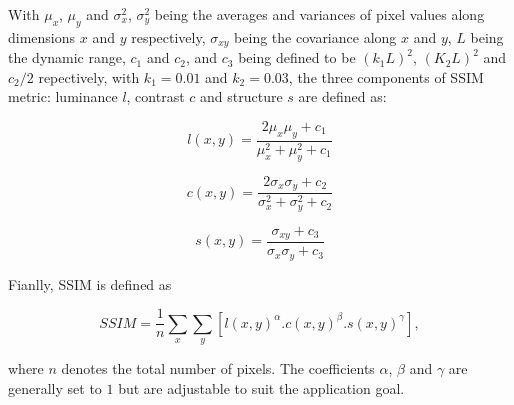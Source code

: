 \documentclass{article}
\begin{document}
With $\mu_x$, $\mu_y$ and $\sigma_x^2$, $\sigma_y^2$ being the averages and variances of pixel values along dimensions $x$ and $y$ respectively, $\sigma_{xy}$ being the covariance along $x$ and $y$, $L$ being the dynamic range, $c_1$ and $c_2$, and $c_3$ being defined to be $(k_1L)^2$, $(K_2L)^2$ and $c_2/2$ repectively, with $k_1=0.01$ and $k_2=0.03$, the three components of SSIM metric: luminance $l$, contrast $c$ and structure $s$ are defined as: 

\begin{equation}
l(x,y) = \frac{2\mu_x\mu_y + c_1}{\mu_x^2 + \mu_y^2 + c_1}
\end{equation}

\begin{equation}
  c(x,y) = \frac{2\sigma_x\sigma_y + c_2}{\sigma_x^2 + \sigma_y^2 + c_2}
\end{equation}

\begin{equation}
  s(x,y) = \frac{\sigma_{xy} + c_3}{\sigma_x\sigma_y + c_3}
\end{equation}

Fianlly, SSIM is defined as

\begin{equation}
  SSIM = \frac{1}{n}\sum_x\sum_y [l(x,y)^\alpha. c(x,y)^\beta. s(x,y)^\gamma],
\end{equation}

where $n$ denotes the total number of pixels. The coefficients $\alpha$, $\beta$ and $\gamma$ are generally set to $1$ but are adjustable to suit the application goal.
\end{document}
